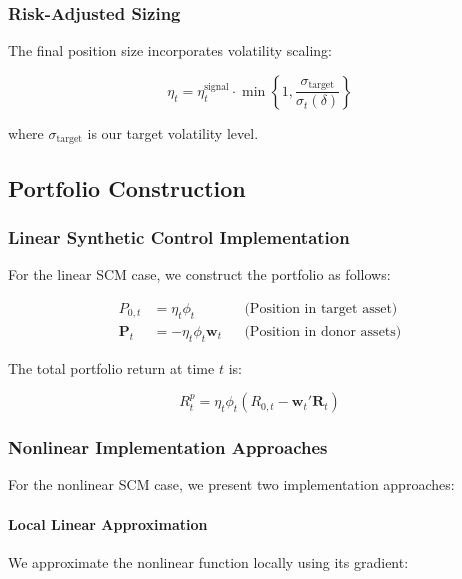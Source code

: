 \subsubsection{Risk-Adjusted Sizing}
The final position size incorporates volatility scaling:

\begin{equation}
    \eta_t = \eta_t^{\text{signal}} \cdot \min\left\{1, \frac{\sigma_{\text{target}}}{\sigma_t(\delta)}\right\}
\end{equation}

where $\sigma_{\text{target}}$ is our target volatility level.

\subsection{Portfolio Construction}

\subsubsection{Linear Synthetic Control Implementation}
For the linear SCM case, we construct the portfolio as follows:

\begin{equation}
\begin{aligned}
    P_{0,t} &= \eta_t\phi_t && \text{(Position in target asset)} \\
    \mathbf{P}_{t} &= -\eta_t\phi_t\mathbf{w}_t && \text{(Position in donor assets)}
\end{aligned}
\end{equation}

The total portfolio return at time $t$ is:

\begin{equation}
    R_t^p = \eta_t\phi_t(R_{0,t} - \mathbf{w}_t'\mathbf{R}_t)
\end{equation}

\subsubsection{Nonlinear Implementation Approaches}

For the nonlinear SCM case, we present two implementation approaches:

\paragraph{Local Linear Approximation}
We approximate the nonlinear function locally using its gradient:

